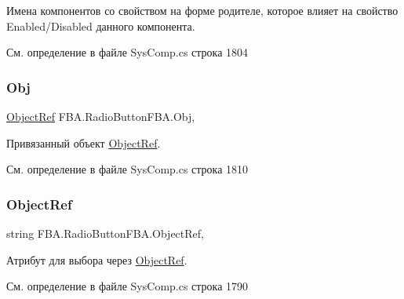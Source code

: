 Имена компонентов со свойством на форме родителе, которое влияет на свойство Enabled/\+Disabled данного компонента. 



См. определение в файле Sys\+Comp.\+cs строка 1804

\mbox{\label{class_f_b_a_1_1_radio_button_f_b_a_a22b00edcfc042171e46b7104fe235f45}} 
\subsubsection{\texorpdfstring{Obj}{Obj}}
{\footnotesize\ttfamily \mbox{\hyperlink{class_f_b_a_1_1_object_ref}{Object\+Ref}} F\+B\+A.\+Radio\+Button\+F\+B\+A.\+Obj\hspace{0.3cm}{\ttfamily [get]}, {\ttfamily [set]}}



Привязанный объект \mbox{\hyperlink{class_f_b_a_1_1_object_ref}{Object\+Ref}}. 



См. определение в файле Sys\+Comp.\+cs строка 1810

\mbox{\label{class_f_b_a_1_1_radio_button_f_b_a_a0a6ac1c4dcf8b9f2a09b19a3ccd2e747}} 
\subsubsection{\texorpdfstring{Object\+Ref}{ObjectRef}}
{\footnotesize\ttfamily string F\+B\+A.\+Radio\+Button\+F\+B\+A.\+Object\+Ref\hspace{0.3cm}{\ttfamily [get]}, {\ttfamily [set]}}



Атрибут для выбора через \mbox{\hyperlink{class_f_b_a_1_1_object_ref}{Object\+Ref}}. ~\newline




См. определение в файле Sys\+Comp.\+cs строка 1790

\mbox{\label{class_f_b_a_1_1_radio_button_f_b_a_a494d3b9ad04576ee6b168584df50f01e}} 
